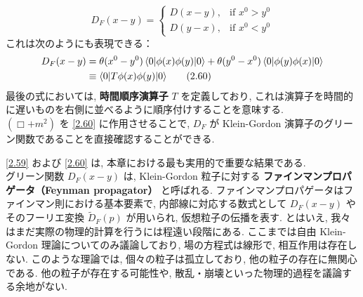 \documentclass[a4paper,12pt]{article}
\begin{document}
\begin{equation*}
D_F(x - y) =
\begin{cases}
D(x - y), & \text{if } x^0 > y^0 \\
D(y - x), & \text{if } x^0 < y^0
\end{cases}
\end{equation*}
これは次のようにも表現できる：
\begin{align*}
D_F(x - y)
&= \theta(x^0 - y^0)\, \langle 0 | \phi(x) \phi(y) | 0 \rangle + \theta(y^0 - x^0)\, \langle 0 | \phi(y) \phi(x) | 0 \rangle \notag \\
&\equiv \langle 0 | T\phi(x) \phi(y) | 0 \rangle \label{2.60}\tag{2.60}
\end{align*}
最後の式においては, \textbf{時間順序演算子} $T$ を定義しており, これは演算子を時間的に遅いものを右側に並べるように順序付けすることを意味する.\\
$(\Box + m^2)$ を \eqref{2.60} に作用させることで, $D_F$ が Klein-Gordon 演算子のグリーン関数であることを直接確認することができる.

\bigskip

\eqref{2.59} および \eqref{2.60} は, 本章における最も実用的で重要な結果である.\\
グリーン関数 $D_F(x - y)$ は, Klein-Gordon 粒子に対する \textbf{ファインマンプロパゲータ（Feynman propagator）} と呼ばれる. ファインマンプロパゲータはファインマン則における基本要素で, 内部線に対応する数式として $D_F(x - y)$ やそのフーリエ変換 $\widetilde{D}_F(p)$ が用いられ, 仮想粒子の伝播を表す. とはいえ, 我々はまだ実際の物理的計算を行うには程遠い段階にある. ここまでは自由 Klein-Gordon 理論についてのみ議論しており, 場の方程式は線形で, 相互作用は存在しない. このような理論では, 個々の粒子は孤立しており, 他の粒子の存在に無関心である. 他の粒子が存在する可能性や, 散乱・崩壊といった物理的過程を議論する余地がない.
\end{document}
